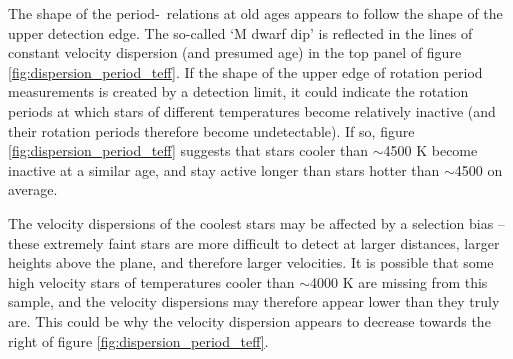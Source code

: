 The shape of the period-\teff\ relations at old ages appears to follow the
shape of the upper detection edge.
The so-called `M dwarf dip' \citep{vansaders2018} is reflected in the lines of
constant velocity dispersion (and presumed age) in the top panel of figure
\ref{fig:dispersion_period_teff}.
If the shape of the upper edge of rotation period measurements is created by a
detection limit, it could indicate the rotation periods at which stars of
different temperatures become relatively inactive (and their rotation periods
therefore become undetectable).
If so, figure \ref{fig:dispersion_period_teff} suggests that stars cooler than
$\sim$4500 K become inactive at a similar age, and stay active longer than
stars hotter than $\sim$4500 on average.


The velocity dispersions of the coolest stars may be affected by a selection
bias -- these extremely faint stars are more difficult to detect at larger
distances, larger heights above the plane, and therefore larger velocities.
It is possible that some high velocity stars of temperatures cooler than
$\sim$4000 K are missing from this sample, and the velocity dispersions may
therefore appear lower than they truly are.
This could be why the velocity dispersion appears to decrease towards the
right of figure \ref{fig:dispersion_period_teff}.


